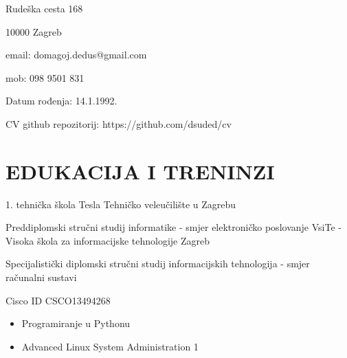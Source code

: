 \documentclass{cv}
\begin{document}

Rudeška cesta 168

10000 Zagreb

email: domagoj.dedus@gmail.com

mob: 098 9501 831

Datum rođenja: 14.1.1992.

CV github repozitorij: https://github.com/dsuded/cv
\section{EDUKACIJA I TRENINZI}
1. tehnička škola Tesla
Tehničko veleučilište u Zagrebu

Preddiplomski stručni studij informatike - smjer elektroničko poslovanje
VsiTe - Visoka škola za informacijske tehnologije Zagreb

Specijalistički diplomski stručni studij informacijskih tehnologija - smjer računalni sustavi

Cisco ID CSCO13494268
\begin{itemize}
    \setlength\itemsep{0.1cm}
    \item Programiranje u Pythonu
    \item Advanced Linux System Administration 1
\end{itemize}
\end{document}
